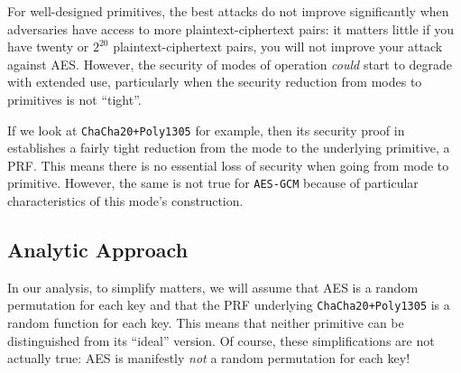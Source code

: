 \documentclass{article}
\begin{document}
For well-designed primitives, the best attacks do not improve significantly when adversaries have access to more plaintext-ciphertext pairs: it matters little if you have twenty or $2^{20}$ plaintext-ciphertext pairs, you will not improve your attack against AES. However, the security of modes of operation \emph{could} start to degrade with extended use, particularly when the security reduction from modes to primitives is not ``tight''.

If we look at \texttt{ChaCha20+Poly1305} for example, then its security proof in~\cite{cryptoeprint:2014:613} establishes a fairly tight reduction from the mode to the underlying primitive, a PRF. This means there is no essential loss of security when going from mode to primitive. 
However, the same is not true for \texttt{AES-GCM} because of particular characteristics of this mode's construction.




\subsection{Analytic Approach}
In our analysis, to simplify matters, we will assume that AES is a random permutation for each key and that the PRF underlying \texttt{ChaCha20+Poly1305} is a random function for each key. This means that neither primitive can be distinguished from its ``ideal'' version. Of course, these simplifications are not actually true: AES is manifestly \emph{not} a random permutation for each key! 
\end{document}
